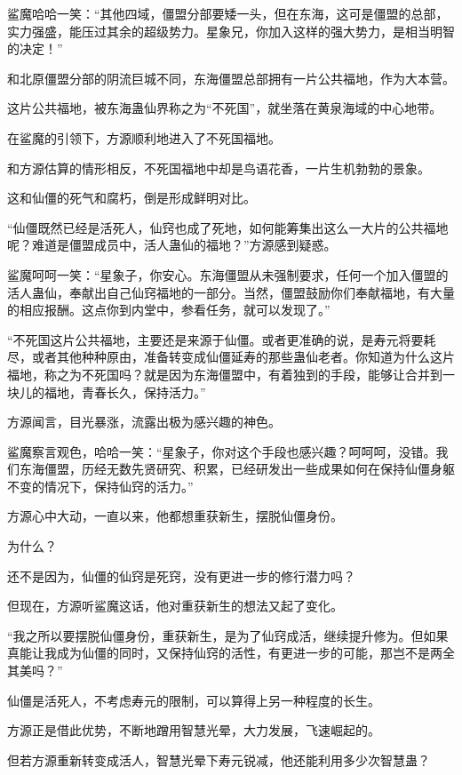 \begin{this_body}
鲨魔哈哈一笑：“其他四域，僵盟分部要矮一头，但在东海，这可是僵盟的总部，实力强盛，能压过其余的超级势力。星象兄，你加入这样的强大势力，是相当明智的决定！”

和北原僵盟分部的阴流巨城不同，东海僵盟总部拥有一片公共福地，作为大本营。

这片公共福地，被东海蛊仙界称之为“不死国”，就坐落在黄泉海域的中心地带。

在鲨魔的引领下，方源顺利地进入了不死国福地。

和方源估算的情形相反，不死国福地中却是鸟语花香，一片生机勃勃的景象。

这和仙僵的死气和腐朽，倒是形成鲜明对比。

“仙僵既然已经是活死人，仙窍也成了死地，如何能筹集出这么一大片的公共福地呢？难道是僵盟成员中，活人蛊仙的福地？”方源感到疑惑。

鲨魔呵呵一笑：“星象子，你安心。东海僵盟从未强制要求，任何一个加入僵盟的活人蛊仙，奉献出自己仙窍福地的一部分。当然，僵盟鼓励你们奉献福地，有大量的相应报酬。这点你到内堂中，参看任务，就可以发现了。”

“不死国这片公共福地，主要还是来源于仙僵。或者更准确的说，是寿元将要耗尽，或者其他种种原由，准备转变成仙僵延寿的那些蛊仙老者。你知道为什么这片福地，称之为不死国吗？就是因为东海僵盟中，有着独到的手段，能够让合并到一块儿的福地，青春长久，保持活力。”

方源闻言，目光暴涨，流露出极为感兴趣的神色。

鲨魔察言观色，哈哈一笑：“星象子，你对这个手段也感兴趣？呵呵呵，没错。我们东海僵盟，历经无数先贤研究、积累，已经研发出一些成果如何在保持仙僵身躯不变的情况下，保持仙窍的活力。”

方源心中大动，一直以来，他都想重获新生，摆脱仙僵身份。

为什么？

还不是因为，仙僵的仙窍是死窍，没有更进一步的修行潜力吗？

但现在，方源听鲨魔这话，他对重获新生的想法又起了变化。

“我之所以要摆脱仙僵身份，重获新生，是为了仙窍成活，继续提升修为。但如果真能让我成为仙僵的同时，又保持仙窍的活性，有更进一步的可能，那岂不是两全其美吗？”

仙僵是活死人，不考虑寿元的限制，可以算得上另一种程度的长生。

方源正是借此优势，不断地蹭用智慧光晕，大力发展，飞速崛起的。

但若方源重新转变成活人，智慧光晕下寿元锐减，他还能利用多少次智慧蛊？


\end{this_body}
